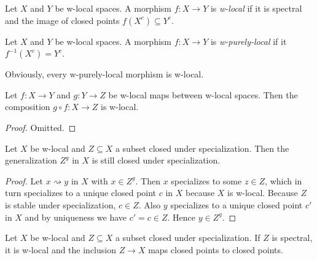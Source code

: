 \begin{definition}
    Let \(X\) and \(Y\) be w-local spaces. A morphism \(f: X \to Y\) is \emph{w-local} if it is spectral and the image of closed points \(f(X^c) \subseteq Y^c\).
    \label{def:w-local-space-map}
    \leanok
\end{definition}

\begin{definition}
    Let \(X\) and \(Y\) be w-local spaces. A morphism $f\colon X \to Y$ is \emph{w-purely-local} if
    it $f^{-1}(X^c) = Y^c$.
    \label{def:w-purely-local-space-map}
\end{definition}

Obviously, every w-purely-local morphism is w-local.

\begin{lemma}
    Let \(f: X \to Y\) and \(g: Y \to Z\) be w-local maps between w-local spaces. Then the composition \(g \circ f: X \to Z\) is w-local.
    \label{thm:w-local-map-composition}
    \leanok
\end{lemma}

\begin{proof}
    \leanok
    Omitted.
\end{proof}

\begin{lemma}
    Let $X$ be w-local and $Z \subseteq X$ a subset closed under specialization. Then the generalization
    $Z^g$ in $X$ is still closed under specialization.
    \label{lemma:generalization-specialization-closed}
    \leanok
\end{lemma}

\begin{proof}
    \leanok
    Let $x \rightsquigarrow y$ in $X$ with $x \in Z^g$. Then $x$ specializes to some $z \in Z$, which
    in turn specializes to a unique closed point $c$ in $X$ because $X$ is w-local.
    Because $Z$ is stable under specialization, $c \in Z$. Also $y$ specializes to a unique closed
    point $c'$ in $X$ and by uniqueness we have $c' = c \in Z$. Hence $y \in Z^g$.
\end{proof}

\begin{lemma}
    Let $X$ be w-local and $Z \subseteq X$ a subset closed under specialization. If
    $Z$ is spectral, it is w-local and the inclusion $Z \to X$ maps closed points to closed points.
    \label{lemma:w-local-specialization-closed}
    \leanok
\end{lemma}

